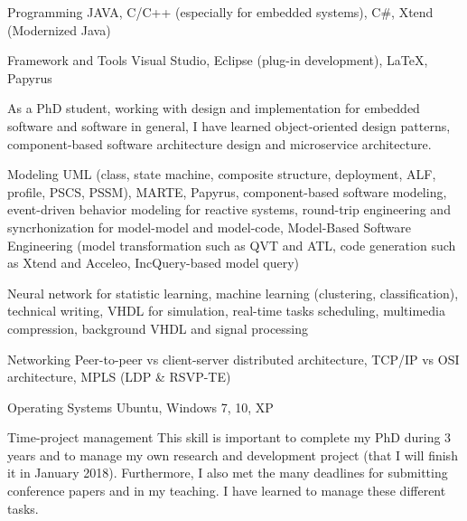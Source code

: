 


\begin{cvskills}

\cvskill
{Programming} %
{JAVA, C/C++ (especially for embedded systems), C\#, Xtend (Modernized Java)} %

\cvskill
{Framework and Tools} %
{Visual Studio, Eclipse (plug-in development), LaTeX, Papyrus} %



{As a PhD student, working with design and implementation for embedded software and software in general, I have learned object-oriented design patterns, component-based software architecture design and microservice architecture.}


\cvskill
{Modeling}
{UML (class, state machine, composite structure, deployment, ALF, profile, PSCS, PSSM), MARTE, Papyrus, component-based software modeling, event-driven behavior modeling for reactive systems, round-trip engineering and syncrhonization for model-model and model-code, Model-Based Software Engineering (model transformation such as QVT and ATL, code generation  such as Xtend and Acceleo, IncQuery-based model query)}


{Neural network for statistic learning, machine learning (clustering, classification), technical writing, VHDL for simulation, real-time tasks scheduling, multimedia compression, background VHDL and signal processing}

\cvskill
{Networking}
{Peer-to-peer vs client-server distributed architecture, TCP/IP vs OSI architecture, MPLS (LDP \& RSVP-TE)}

\cvskill
{Operating Systems} %
{Ubuntu, Windows 7, 10, XP} %

\vspace{0.1cm}
\cvskill
{Time-project management} %
{This skill is important to complete my PhD during 3 years and to manage my own research and development project (that I will finish it in January 2018). Furthermore, I also met the many deadlines for submitting conference papers and in my teaching.
	I have learned to manage these different tasks.} %


\end{cvskills}
